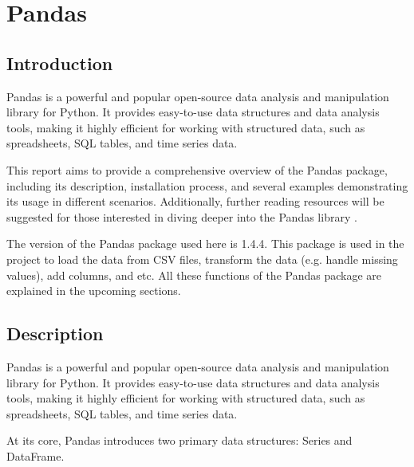 %
%


\chapter{Pandas}

	\section{Introduction}
	
	Pandas is a powerful and popular open-source data analysis and manipulation library for Python. It provides easy-to-use data structures and data analysis tools, making it highly efficient for working with structured data, such as spreadsheets, SQL tables, and time series data.
	
	This report aims to provide a comprehensive overview of the Pandas package, including its description, installation process, and several examples demonstrating its usage in different scenarios. Additionally, further reading resources will be suggested for those interested in diving deeper into the Pandas library \cite{McKinney:2012}. 
	
	The version of the Pandas package used here is 1.4.4. This package is used in the project to load the data from CSV files, transform the data (e.g. handle missing values), add columns, and etc. All these functions of the Pandas package are explained in the upcoming sections.
	
	\section{Description}
	
	Pandas is a powerful and popular open-source data analysis and manipulation library for Python. It provides easy-to-use data structures and data analysis tools, making it highly efficient for working with structured data, such as spreadsheets, SQL tables, and time series data.
	
	At its core, Pandas introduces two primary data structures: Series and DataFrame. 
	
